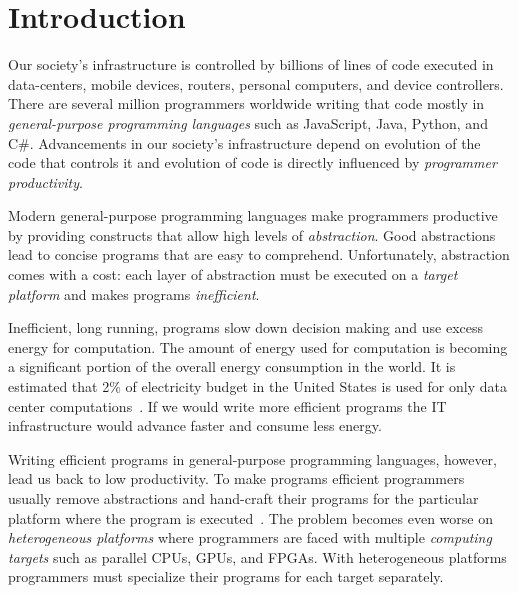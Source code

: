 \chapter{Introduction}
\label{sct:introduction}

Our society's infrastructure is controlled by billions of lines of code executed in data-centers,
 mobile devices, routers, personal computers, and device controllers. There are
 several million programmers worldwide writing that code mostly
 in \emph{general-purpose programming languages} such as JavaScript, Java, Python,
 and C\#. Advancements in our society's infrastructure depend on evolution of the code that controls it and
 evolution of code is directly influenced by \emph{programmer productivity}.


Modern general-purpose programming languages make programmers productive by
 providing constructs that allow high levels of \emph{abstraction}. Good abstractions lead to
 concise programs that are easy to comprehend. Unfortunately, abstraction comes with a cost: each layer of
 abstraction must be executed on a \emph{target platform} and makes programs \emph{inefficient}.

Inefficient, long running, programs slow down decision making and use excess energy
 for computation. The amount of energy used for computation is becoming a significant
 portion of the overall energy consumption in the world. It is estimated that 2\% of
 electricity budget in the United States is used for only data center computations~\cite{mukherjee2009spatio}. If
 we would write more efficient programs the IT infrastructure would advance faster and consume less energy.

Writing efficient programs in general-purpose programming languages, however, lead us back to
 low productivity. To make programs efficient programmers usually remove abstractions and
 hand-craft their programs for the particular platform where the program is executed~\cite{lee2011implementing}.
 The problem becomes even worse on \emph{heterogeneous platforms} where programmers are faced with multiple \emph{computing targets} such as parallel CPUs, GPUs, and FPGAs. With heterogeneous platforms programmers must specialize their programs for each target separately.

